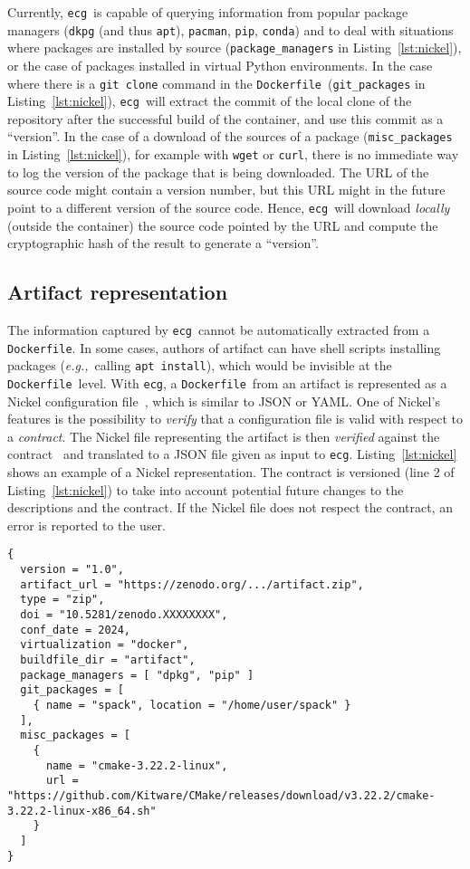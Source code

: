 \documentclass[sigconf,natbib=false]{acmart}
\newcommand{\eg}{\emph{e.g.,}}
\newcommand{\df}{\texttt{Dockerfile}}
\newcommand{\ecg}{\texttt{ecg}}
\begin{document}
Currently, \ecg\ is capable of querying information from popular package managers (\texttt{dkpg} (and thus \texttt{apt}), \texttt{pacman}, \texttt{pip}, \texttt{conda}) and to deal with situations where packages are installed by source (\texttt{package\_managers} in Listing~\ref{lst:nickel}), or the case of packages installed in virtual Python environments.
In the case where there is a \texttt{git clone} command in the \df\ (\texttt{git\_packages} in Listing~\ref{lst:nickel}), \ecg\ will extract the commit of the local clone of the repository after the successful build of the container, and use this commit as a ``version''.
In the case of a download of the sources of a package (\texttt{misc\_packages} in Listing~\ref{lst:nickel}), for example with \texttt{wget} or \texttt{curl}, there is no immediate way to log the version of the package that is being downloaded.
The URL of the source code might contain a version number, but this URL might in the future point to a different version of the source code.
Hence, \ecg\ will download \emph{locally} (outside the container) the source code pointed by the URL and compute the cryptographic hash of the result to generate a ``version''.

\subsection{Artifact representation}\label{sec:nickel}

The information captured by \ecg\ cannot be automatically extracted from a \df.
In some cases, authors of artifact can have shell scripts installing packages (\eg\ calling \texttt{apt install}), which would be invisible at the \df\ level.
With \ecg, a \df\ from an artifact is represented as a Nickel configuration file~\cite{nickel}, which is similar to JSON or YAML.
One of Nickel's features is the possibility to \emph{verify} that a configuration file is valid with respect to a \emph{contract}.
The Nickel file representing the artifact is then \emph{verified} against the contract~\cite{ecg_contract} and translated to a JSON file given as input to \ecg.
Listing~\ref{lst:nickel} shows an example of a Nickel representation.
The contract is versioned (line 2 of Listing~\ref{lst:nickel}) to take into account potential future changes to the descriptions and the contract.
If the Nickel file does not respect the contract, an error is reported to the user.

\begin{lstlisting}[caption=Example of Artifact representation in Nickel, label=lst:nickel]
{
  version = "1.0",
  artifact_url = "https://zenodo.org/.../artifact.zip",
  type = "zip",
  doi = "10.5281/zenodo.XXXXXXXX",
  conf_date = 2024,
  virtualization = "docker",
  buildfile_dir = "artifact",
  package_managers = [ "dpkg", "pip" ]
  git_packages = [
    { name = "spack", location = "/home/user/spack" }
  ],
  misc_packages = [
    {
      name = "cmake-3.22.2-linux",
      url = "https://github.com/Kitware/CMake/releases/download/v3.22.2/cmake-3.22.2-linux-x86_64.sh"
    }
  ]
}
\end{lstlisting}
\end{document}
